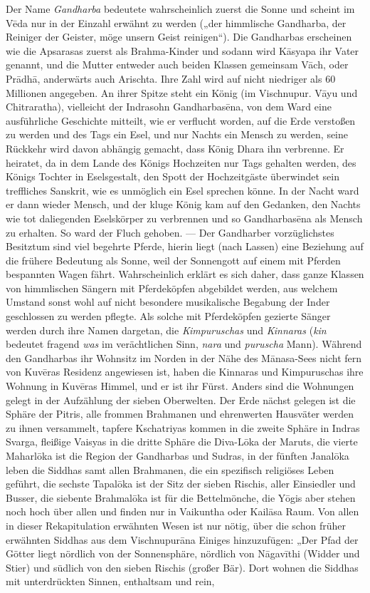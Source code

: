 \documentclass{article}
\begin{document}
Der Name \emph{Gandharba} bedeutete wahrscheinlich zuerst die Sonne und scheint im V\={e}da nur in der Einzahl erwähnt zu werden („der himmlische Gandharba, der Reiniger der Geister, möge unsern Geist reinigen“). Die Gandharbas erscheinen wie die Apsarasas zuerst als Brahma-Kinder und sodann wird K\={a}syapa ihr Vater genannt, und die Mutter entweder auch beiden Klassen gemeinsam V\={a}ch, oder Pr\={a}dh\={a}, anderwärts auch Arischta. Ihre Zahl wird auf nicht niedriger als 60 Millionen angegeben. An ihrer Spitze steht ein König (im Vischnupur. V\={a}yu und Chitraratha), vielleicht der Indrasohn Gandharbas\={e}na, von dem Ward eine ausführliche Geschichte mitteilt, wie er verflucht worden, auf die Erde verstoßen zu werden und des Tags ein Esel, und nur Nachts ein Mensch zu werden, seine Rückkehr wird davon abhängig gemacht, dass König Dhara ihn verbrenne. Er heiratet, da in dem Lande des Königs Hochzeiten nur Tags gehalten werden, des Königs Tochter in Eselsgestalt, den Spott der Hochzeitgäste überwindet sein treffliches Sanskrit, wie es unmöglich ein Esel sprechen könne. In der Nacht ward er dann wieder Mensch, und der kluge König kam auf den Gedanken, den Nachts wie tot daliegenden Eselskörper zu verbrennen und so Gandharbas\={e}na als Mensch zu erhalten. So ward der Fluch gehoben. — Der Gandharber vorzüglichstes Besitztum sind viel begehrte Pferde, hierin liegt (nach Lassen) eine Beziehung auf die frühere Bedeutung als Sonne, weil der Sonnengott auf einem mit Pferden bespannten Wagen fährt. Wahrscheinlich erklärt es sich daher, dass ganze Klassen von himmlischen Sängern mit Pferdeköpfen abgebildet werden, aus welchem Umstand sonst wohl auf nicht besondere musikalische Begabung der Inder geschlossen zu werden pflegte. Als solche mit Pferdeköpfen gezierte Sänger werden durch ihre Namen dargetan, die \emph{Kimpuruschas} und \emph{Kinnaras} (\emph{kin} bedeutet fragend \emph{was} im verächtlichen Sinn, \emph{nara} und \emph{puruscha} Mann). Während den Gandharbas ihr Wohnsitz im Norden in der Nähe des M\={a}nasa-Sees nicht fern von Kuv\={e}ras Residenz angewiesen ist, haben die Kinnaras und Kimpuruschas ihre Wohnung in Kuv\={e}ras Himmel, und er ist ihr Fürst. Anders sind die Wohnungen gelegt in der Aufzählung der sieben Oberwelten. Der Erde nächst gelegen ist die Sphäre der Pitris, alle frommen Brahmanen und ehrenwerten Hausväter werden zu ihnen versammelt, tapfere Kschatriyas kommen in die zweite Sphäre in Indras Svarga, fleißige Vaisyas in die dritte Sphäre die Diva-L\={o}ka der Maruts, die vierte Maharl\={o}ka ist die Region der Gandharbas und Sudras, in der fünften Janal\={o}ka leben die Siddhas samt allen Brahmanen, die ein spezifisch religiöses Leben geführt, die sechste Tapal\={o}ka ist der Sitz der sieben Rischis, aller Einsiedler und Busser, die siebente Brahmal\={o}ka ist für die Bettelmönche, die Y\={o}gis aber stehen noch hoch über allen und finden nur in Vaikuntha oder Kail\={a}sa Raum. Von allen in dieser Rekapitulation erwähnten Wesen ist nur nötig, über die schon früher erwähnten Siddhas aus dem Vischnupur\={a}na Einiges hinzuzufügen: „Der Pfad der Götter liegt nördlich von der Sonnensphäre, nördlich von N\={a}gav\={i}thi (Widder und Stier) und südlich von den sieben Rischis (großer Bär). Dort wohnen die Siddhas mit unterdrückten Sinnen, enthaltsam und rein, 
\end{document}
